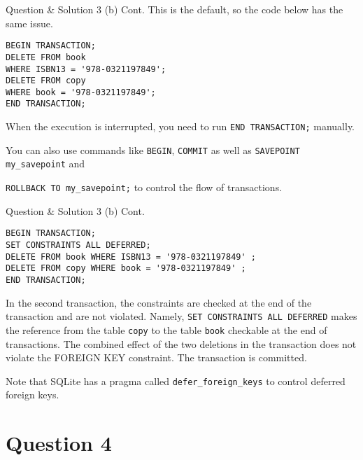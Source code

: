 \begin{frame}[fragile]{Question \& Solution 3 (b) Cont.}
This is the default, so the code below has the same issue.

\begin{lstlisting}
BEGIN TRANSACTION;
DELETE FROM book 
WHERE ISBN13 = '978-0321197849';
DELETE FROM copy 
WHERE book = '978-0321197849';
END TRANSACTION;
\end{lstlisting}

When the execution is interrupted, you need to run \texttt{END TRANSACTION;} manually. \vspace{10pt}

You can also use commands like \texttt{BEGIN}, \texttt{COMMIT} as well as  \texttt{SAVEPOINT my\_savepoint} and 

\texttt{ROLLBACK TO my\_savepoint;} to control the flow of transactions.

\end{frame}


\begin{frame}[fragile]{Question \& Solution 3 (b) Cont.}

\begin{lstlisting}
BEGIN TRANSACTION;
SET CONSTRAINTS ALL DEFERRED;
DELETE FROM book WHERE ISBN13 = '978-0321197849' ;
DELETE FROM copy WHERE book = '978-0321197849' ;
END TRANSACTION;
\end{lstlisting}

In the second transaction, the constraints are checked at the end of the transaction and are not violated.  Namely, \texttt{SET CONSTRAINTS ALL DEFERRED} makes the reference from the table \texttt{copy} to the table \texttt{book} checkable at the end of transactions. The combined effect of the two deletions in the transaction does not violate the FOREIGN KEY constraint. The transaction is committed. \vspace{10pt}

Note that SQLite has a pragma called \texttt{defer\_foreign\_keys} to control deferred foreign keys.
\end{frame}

\section*{Question 4}

